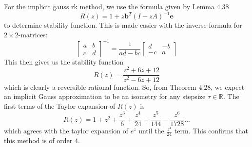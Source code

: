 \documentclass{article}
\theoremstyle{definition}
\begin{document}
\begin{itemize}
		For the implicit gauss rk method, we use the formula given by
		Lemma $4.38$
		\[
			R(z) = 1 + z \mathbf{b}^T(I - zA)^{-1} \mathbf{e}
		\]
		to determine stability function.  This is made easier with the
		inverse formula for $2 \times 2$-matrices:
		\[
			\begin{bmatrix}
				a & b \\
				c & d
			\end{bmatrix}^{-1} =
			\frac{1}{ad - bc}
			\begin{bmatrix}
				d & -b \\
				-c & a
			\end{bmatrix}
		\]
		This then gives us the stability function
		\[
			R(z) = \frac{z^2 + 6z + 12}{z^2 - 6z + 12}
		\]
		which is clearly a reversible rational function.  So, from
		Theorem $4.28$, we expect an
		implicit Gauss approximation to be an isometry for any
		stepsize $\tau \in \mathbb{R}$.
		The first terms of the Taylor expansion of $R(z)$ is
		\[
			R(z) = 1 + z^2 + \frac{z^3}{6} + \frac{z^4}{24} +
				\frac{z^5}{144} - \frac{z^6}{1728} \ldots
		\]
		which agrees with the taylor expansion of $e^z$ until the
		$\frac{z^4}{24}$ term.  This confirms that this method is of
		order $4$.


\end{itemize}
\end{document}

